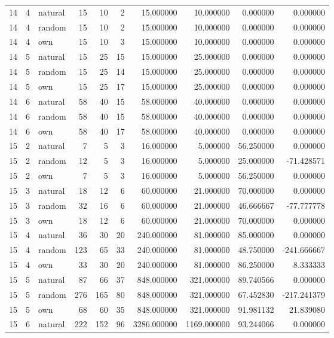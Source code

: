 \begin{table}[htbp]
\begin{tabular}{rrlrrrrrrr}
14 & 4 & natural & 15 & 10 & 2 & 15.000000 & 10.000000 & 0.000000 & 0.000000 \\
14 & 4 & random & 15 & 10 & 2 & 15.000000 & 10.000000 & 0.000000 & 0.000000 \\
14 & 4 & own & 15 & 10 & 3 & 15.000000 & 10.000000 & 0.000000 & 0.000000 \\
14 & 5 & natural & 15 & 25 & 15 & 15.000000 & 25.000000 & 0.000000 & 0.000000 \\
14 & 5 & random & 15 & 25 & 14 & 15.000000 & 25.000000 & 0.000000 & 0.000000 \\
14 & 5 & own & 15 & 25 & 17 & 15.000000 & 25.000000 & 0.000000 & 0.000000 \\
14 & 6 & natural & 58 & 40 & 15 & 58.000000 & 40.000000 & 0.000000 & 0.000000 \\
14 & 6 & random & 58 & 40 & 15 & 58.000000 & 40.000000 & 0.000000 & 0.000000 \\
14 & 6 & own & 58 & 40 & 17 & 58.000000 & 40.000000 & 0.000000 & 0.000000 \\
15 & 2 & natural & 7 & 5 & 3 & 16.000000 & 5.000000 & 56.250000 & 0.000000 \\
15 & 2 & random & 12 & 5 & 3 & 16.000000 & 5.000000 & 25.000000 & -71.428571 \\
15 & 2 & own & 7 & 5 & 3 & 16.000000 & 5.000000 & 56.250000 & 0.000000 \\
15 & 3 & natural & 18 & 12 & 6 & 60.000000 & 21.000000 & 70.000000 & 0.000000 \\
15 & 3 & random & 32 & 16 & 6 & 60.000000 & 21.000000 & 46.666667 & -77.777778 \\
15 & 3 & own & 18 & 12 & 6 & 60.000000 & 21.000000 & 70.000000 & 0.000000 \\
15 & 4 & natural & 36 & 30 & 20 & 240.000000 & 81.000000 & 85.000000 & 0.000000 \\
15 & 4 & random & 123 & 65 & 33 & 240.000000 & 81.000000 & 48.750000 & -241.666667 \\
15 & 4 & own & 33 & 30 & 20 & 240.000000 & 81.000000 & 86.250000 & 8.333333 \\
15 & 5 & natural & 87 & 66 & 37 & 848.000000 & 321.000000 & 89.740566 & 0.000000 \\
15 & 5 & random & 276 & 165 & 80 & 848.000000 & 321.000000 & 67.452830 & -217.241379 \\
15 & 5 & own & 68 & 60 & 35 & 848.000000 & 321.000000 & 91.981132 & 21.839080 \\
15 & 6 & natural & 222 & 152 & 96 & 3286.000000 & 1169.000000 & 93.244066 & 0.000000 \\

\end{tabular}
\end{table}
